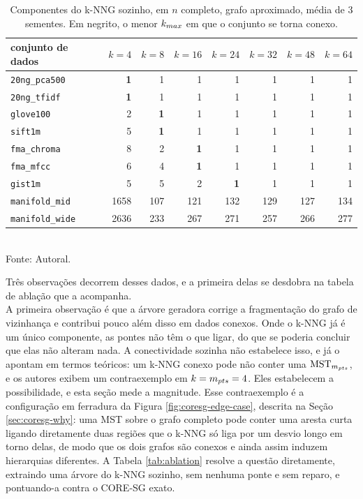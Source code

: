 \begin{table}[htb!]
\caption{\label{tab:connectivity} Componentes do \ac{k-NNG} sozinho, em $n$ completo, grafo aproximado, média de 3 sementes. Em negrito, o menor $k_{max}$ em que o conjunto se torna conexo.}
\centering
\footnotesize
\begin{tabular}{@{}lrrrrrrr@{}}
\toprule
conjunto de dados & $k=4$ & $k=8$ & $k=16$ & $k=24$ & $k=32$ & $k=48$ & $k=64$ \\
\midrule
\texttt{20ng\_pca500} & \textbf{1} & 1 & 1 & 1 & 1 & 1 & 1 \\
\texttt{20ng\_tfidf}  & \textbf{1} & 1 & 1 & 1 & 1 & 1 & 1 \\
\texttt{glove100}     & 2 & \textbf{1} & 1 & 1 & 1 & 1 & 1 \\
\texttt{sift1m}       & 5 & \textbf{1} & 1 & 1 & 1 & 1 & 1 \\
\texttt{fma\_chroma}  & 8 & 2 & \textbf{1} & 1 & 1 & 1 & 1 \\
\texttt{fma\_mfcc}    & 6 & 4 & \textbf{1} & 1 & 1 & 1 & 1 \\
\texttt{gist1m}       & 5 & 5 & 2 & \textbf{1} & 1 & 1 & 1 \\
\midrule
\texttt{manifold\_mid}  & 1658 & 107 & 121 & 132 & 129 & 127 & 134 \\
\texttt{manifold\_wide} & 2636 & 233 & 267 & 271 & 257 & 266 & 277 \\
\bottomrule
\end{tabular}\\
Fonte: Autoral.
\end{table}

Três observações decorrem desses dados, e a primeira delas se desdobra na tabela de ablação que a acompanha.\\

A primeira observação é que a árvore geradora corrige a fragmentação do grafo de vizinhança e contribui pouco além disso em dados conexos. Onde o \ac{k-NNG} já é um único componente, as pontes não têm o que ligar, do que se poderia concluir que elas não alteram nada. A conectividade sozinha não estabelece isso, e  já o apontam em termos teóricos: um \ac{k-NNG} conexo pode não conter uma $\mathrm{MST}_{m_{pts}}$, e os autores exibem um contraexemplo em $k = m_{pts} = 4$. Eles estabelecem a possibilidade, e esta seção mede a magnitude. Esse contraexemplo é a configuração em ferradura da Figura \ref{fig:coresg-edge-case}, descrita na Seção \ref{sec:coresg-why}: uma \ac{MST} sobre o grafo completo pode conter uma aresta curta ligando diretamente duas regiões que o \ac{k-NNG} só liga por um desvio longo em torno delas, de modo que os dois grafos são conexos e ainda assim induzem hierarquias diferentes. A Tabela \ref{tab:ablation} resolve a questão diretamente, extraindo uma árvore do \ac{k-NNG} sozinho, sem nenhuma ponte e sem reparo, e pontuando-a contra o \ac{CORE-SG} exato.\\

